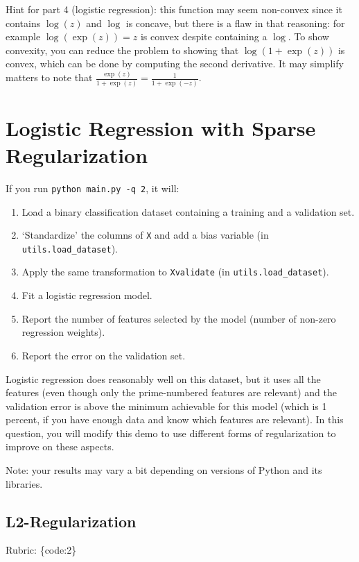 \documentclass{article}
\def\rubric#1{\gre{Rubric: \{#1\}}}{}
\def\gre#1{{\color{gre}#1}}
\def\enum#1{\begin{enumerate}#1\end{enumerate}}
\begin{document}
Hint for part 4 (logistic regression): this function may seem non-convex since it contains $\log(z)$ and $\log$ is concave, but there is a flaw in that reasoning: for example $\log(\exp(z))=z$ is convex despite containing a $\log$. To show convexity, you can reduce the problem to showing that $\log(1+\exp(z))$ is convex, which can be done by computing the second derivative. It may simplify matters to note that $\frac{\exp(z)}{1+\exp(z)} = \frac{1}{1+\exp(-z)}$.


\section{Logistic Regression with Sparse Regularization}

If you run  \verb|python main.py -q 2|, it will:
\enum{
\item Load a binary classification dataset containing a training and a validation set.
\item `Standardize' the columns of \texttt{X} and add a bias variable (in \texttt{utils.load\_dataset}).
\item Apply the same transformation to \texttt{Xvalidate} (in \texttt{utils.load\_dataset}).
\item Fit a logistic regression model.
\item Report the number of features selected by the model (number of non-zero regression weights).
\item Report the error on the validation set.
}
Logistic regression does reasonably well on this dataset,
but it uses all the features (even though only the prime-numbered features are relevant)
and the validation error is above the minimum achievable for this model
(which is 1 percent, if you have enough data and know which features are relevant).
In this question, you will modify this demo to use different forms of regularization
 to improve on these aspects.

Note: your results may vary a bit depending on versions of Python and its libraries.


\subsection{L2-Regularization}
\rubric{code:2}
\end{document}
